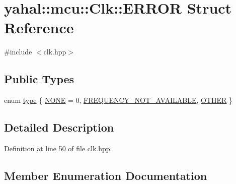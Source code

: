 \hypertarget{structyahal_1_1mcu_1_1_clk_1_1_e_r_r_o_r}{}\section{yahal\+:\+:mcu\+:\+:Clk\+:\+:E\+R\+R\+O\+R Struct Reference}
\label{structyahal_1_1mcu_1_1_clk_1_1_e_r_r_o_r}


{\ttfamily \#include $<$clk.\+hpp$>$}

\subsection*{Public Types}
\begin{DoxyCompactItemize}
\item 
enum \hyperlink{structyahal_1_1mcu_1_1_clk_1_1_e_r_r_o_r_a951027d8ffd3221fcc9e1f68421485d9}{type} \{ \hyperlink{structyahal_1_1mcu_1_1_clk_1_1_e_r_r_o_r_a951027d8ffd3221fcc9e1f68421485d9a2e24934b16f0dd0c1f8709ca36e2e87d}{N\+O\+N\+E} = 0, 
\hyperlink{structyahal_1_1mcu_1_1_clk_1_1_e_r_r_o_r_a951027d8ffd3221fcc9e1f68421485d9a34c7a6ac0b66d930ca5a053fa16effa6}{F\+R\+E\+Q\+U\+E\+N\+C\+Y\+\_\+\+N\+O\+T\+\_\+\+A\+V\+A\+I\+L\+A\+B\+L\+E}, 
\hyperlink{structyahal_1_1mcu_1_1_clk_1_1_e_r_r_o_r_a951027d8ffd3221fcc9e1f68421485d9a4742b0dd7ae8adc31dd2dff7ca226766}{O\+T\+H\+E\+R}
 \}
\end{DoxyCompactItemize}


\subsection{Detailed Description}


Definition at line 50 of file clk.\+hpp.



\subsection{Member Enumeration Documentation}
\hypertarget{structyahal_1_1mcu_1_1_clk_1_1_e_r_r_o_r_a951027d8ffd3221fcc9e1f68421485d9}{}
